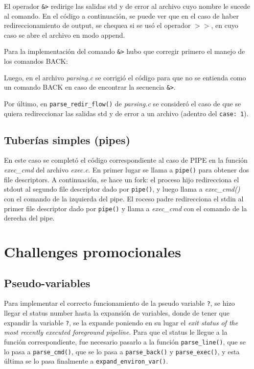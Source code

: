 \documentclass{article}
\begin{document}
El operador \texttt{\&\textgreater} redirige las salidas std y de error al archivo cuyo nombre le sucede al comando.
En el código a continuación, se puede ver que en el caso de haber redireccionamiento de output, se chequea si se usó el operador \texttt{$>>$}, en cuyo caso se abre el archivo en modo append.

Para la implementación del comando \texttt{\&\textgreater} hubo que corregir primero el manejo de los comandos BACK:

Luego, en el archivo \textit{parsing.c} se corrigió el código para que no se entienda como un comando BACK en caso de encontrar la secuencia \texttt{\&\textgreater}. 

Por último, en \texttt{parse\_redir\_flow()} de \textit{parsing.c} se consideró el caso de que se quiera redireccionar las salidas std y de error a un archivo (adentro del \texttt{case: 1}).


\subsection{Tuberías simples (pipes)}
En este caso se completó el código correspondiente al caso de PIPE en la función \textit{exec\_cmd} del archivo \textit{exec.c}. En primer lugar se llama a \texttt{pipe()} para obtener dos file descriptors. A continuación, se hace un fork: el proceso hijo redirecciona el stdout al segundo file descriptor dado por \texttt{pipe()}, y luego llama a \textit{exec\_cmd()} con el comando de la izquierda del pipe. El roceso padre redirecciona el stdin al primer file descriptor dado por \texttt{pipe()} y llama a \textit{exec\_cmd} con el comando de la derecha del pipe.


\newpage
\section{Challenges promocionales}
\subsection{Pseudo-variables}
Para implementar el correcto funcionamiento de la pseudo variable \texttt{?}, se hizo llegar el status number hasta la expansión de variables, donde de tener que expandir la variable \texttt{?}, se la expande poniendo en su lugar el \textit{exit status of the most recently executed foreground pipeline}. Para que el status le llegue a la función correspondiente, fue necesario pasarlo a la función \texttt{parse\_line()}, que se lo pasa a \texttt{parse\_cmd()}, que se lo pasa a \texttt{parse\_back()} y \texttt{parse\_exec()}, y esta última se lo pasa finalmente a \texttt{expand\_environ\_var()}.
\end{document}
